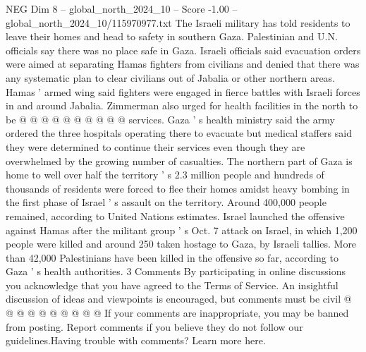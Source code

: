 \begin{textsample}{NEG Dim 8 – global\_north\_2024\_10 – Score -1.00 – global\_north\_2024\_10/115970977.txt}
The Israeli military has told residents to leave their homes and head to safety in southern Gaza.
Palestinian and U.N. officials say there was no place safe in Gaza.
Israeli officials said evacuation orders were aimed at separating Hamas fighters from civilians and denied that there was any systematic plan to clear civilians out of Jabalia or other northern areas.
Hamas ' armed wing said fighters were engaged in fierce battles with Israeli forces in and around Jabalia.
Zimmerman also urged for health facilities in the north to be @ @ @ @ @ @ @ @ @ @ services.
Gaza ' s health ministry said the army ordered the three hospitals operating there to evacuate but medical staffers said they were determined to continue their services even though they are overwhelmed by the growing number of casualties.
The northern part of Gaza is home to well over half the territory ' s 2.3 million people and hundreds of thousands of residents were forced to flee their homes amidst heavy bombing in the first phase of Israel ' s assault on the territory.
Around 400,000 people remained, according to United Nations estimates.
Israel launched the offensive against Hamas after the militant group ' s Oct. 7 attack on Israel, in which 1,200 people were killed and around 250 taken hostage to Gaza, by Israeli tallies.
More than 42,000 Palestinians have been killed in the offensive so far, according to Gaza ' s health authorities. 3 Comments By participating in online discussions you acknowledge that you have agreed to the Terms of Service.
An insightful discussion of ideas and viewpoints is encouraged, but comments must be civil @ @ @ @ @ @ @ @ @ @ If your comments are inappropriate, you may be banned from posting.
Report comments if you believe they do not follow our guidelines.Having trouble with comments?
Learn more here.

\end{textsample}
